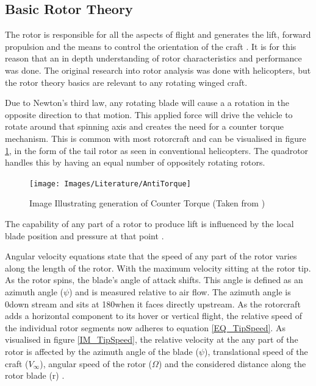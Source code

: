 	\subsection{Basic Rotor Theory}
	The rotor is responsible for all the aspects of flight and generates the lift, forward propulsion and the means to control the orientation of the craft \cite{Leishman}. It is for this reason that an in depth understanding of rotor characteristics and performance was done. The original research into rotor analysis was done with helicopters, but the rotor theory basics are relevant to any rotating winged craft.
	
	Due to Newton's third law, any rotating blade will cause a a rotation in the opposite direction to that motion. This applied force will drive the vehicle to rotate around that spinning axis and creates the need for a counter torque mechanism. This is common with most rotorcraft and can be visualised in figure \ref{IM_Antitorque}, in the form of the tail rotor as seen in conventional helicopters. The quadrotor handles this by having an equal number of oppositely rotating rotors.
	
	\begin{figure}[H]
	\centering
	\texttt{[image: Images/Literature/AntiTorque]}
	\caption{Image Illustrating generation of Counter Torque (Taken from \cite{Heli})}
	\label{IM_Antitorque}
	\end{figure}
	
	The capability of any part of a rotor to produce lift is influenced by the local blade position and pressure at that point \cite{Leishman}.

	Angular velocity equations state that the speed of any part of the rotor varies along the length of the rotor. With the maximum velocity sitting at the rotor tip. As the rotor spins, the blade's angle of attack shifts. This angle is defined as an azimuth angle ($\psi$) and is measured relative to air flow. The azimuth angle is 0\textdegree down stream and sits at 180\textdegree when it faces directly upstream. As the rotorcraft adds a horizontal component to its hover or vertical flight, the relative speed of the individual rotor segments now adheres to equation \eqref{EQ_TipSpeed}.  As visualised in figure \ref{IM_TipSpeed}, the relative velocity at the any part of the rotor is affected by the azimuth angle of the blade ($\psi$), translational speed of the craft ($V_{\infty}$), angular speed of the rotor ($\Omega$) and the considered distance along the rotor blade (r) \cite{Leishman} \cite{RotorCraftHand}. 

